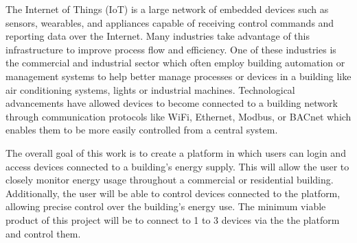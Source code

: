 \documentclass[conference]{IEEEtran}
\begin{document}
The Internet of Things (IoT) is a large network of embedded devices such as sensors, wearables, and appliances capable of receiving control commands and reporting
data over the Internet. Many industries take advantage of this infrastructure to
improve process flow and efficiency. One of these industries is the commercial
and industrial sector which often employ building automation or management
systems to help better manage processes or devices in a building like air
conditioning systems, lights or industrial machines. Technological advancements
have allowed devices to become connected to a building network through
communication protocols like WiFi, Ethernet, Modbus, or BACnet which enables
them to be more easily controlled from a central system.


The overall goal of this work is to create a platform in which users can login and access devices
connected to a building's energy supply. This will allow the user to closely
monitor energy usage throughout a commercial or residential building.
Additionally, the user will be able to control devices connected to the
platform, allowing precise control over the building's energy use. The minimum
viable product of this project will be to connect to 1 to 3 devices via the the
platform and control them.


\end{document}
